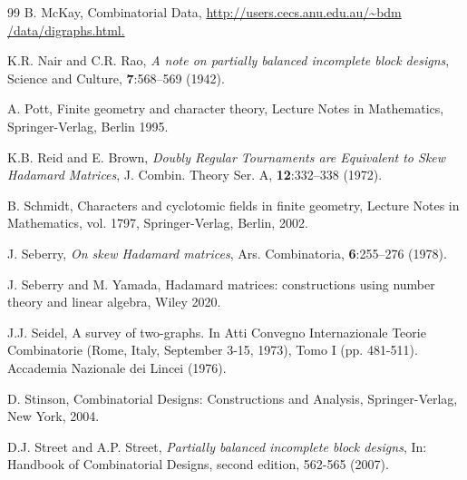 \documentclass[11pt]{article}
\begin{document}
\begin{thebibliography}{99}
 B. McKay, Combinatorial Data, \url{http://users.cecs.anu.edu.au/~bdm /data/digraphs.html.}

K.R. Nair and C.R. Rao, 
\textit{A note on partially balanced incomplete block designs}, 
Science and Culture, \textbf{7}:568--569 (1942).
 

A. Pott, Finite geometry and character theory, Lecture Notes in Mathematics, Springer-Verlag, Berlin 1995.

K.B. Reid and E. Brown,\textit{ Doubly Regular Tournaments are Equivalent to Skew Hadamard Matrices}, J. Combin. Theory Ser. A, \textbf{12}:332--338 (1972).  


B. Schmidt, Characters and cyclotomic fields in finite geometry, Lecture Notes in Mathematics, vol. 1797, Springer-Verlag, Berlin, 2002.

J. Seberry, 
\emph{On skew Hadamard matrices}, 
Ars. Combinatoria, \textbf{6}:255--276 (1978). 

J. Seberry and M. Yamada, Hadamard matrices: constructions using number theory and linear
algebra, Wiley 2020.

J.J. Seidel,  A survey of two-graphs. In Atti Convegno Internazionale Teorie Combinatorie (Rome, Italy, September 3-15, 1973), Tomo I (pp. 481-511). Accademia Nazionale dei Lincei (1976).

D. Stinson, Combinatorial Designs: Constructions
and Analysis, Springer-Verlag, New York, 2004.

D.J. Street and  A.P. Street, \textit{Partially balanced incomplete block designs},  In: Handbook of Combinatorial Designs, second edition, 562-565 (2007).





\end{thebibliography}
\end{document}
